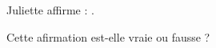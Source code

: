 \documentclass[exercice]{thedocument}%
\begin{document}
%
\begin{flushleft}
    Juliette affirme : .\par Cette afirmation est-elle vraie ou fausse ?
\end{flushleft}
\begin{center}
\end{center}
\end{document}
